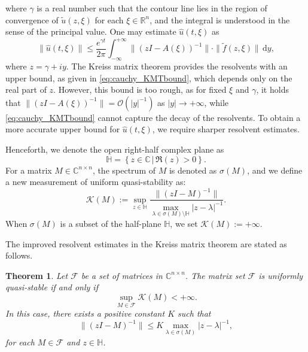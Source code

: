 \documentclass{article}
\theoremstyle{plain}%
\newtheorem{theorem}{Theorem}%
\theoremstyle{definition}%
\theoremstyle{remark}%
\newcommand{\bC}{\mathbb{C}}
\newcommand{\bH}{\mathbb{H}}
\newcommand{\bR}{\mathbb{R}}
\newcommand{\cF}{\mathcal{F}}
\newcommand{\cK}{\mathcal{K}}
\newcommand{\cO}{\mathcal{O}}
\newcommand{\rd}{\mathrm{d}}
\newcommand{\+}[1]{{\bm{#1}}}
\newcommand{\norm}[1]{\|{#1}\|}
\begin{document}
where $\gamma$ is a real number such that the contour line lies in 
the region of convergence of $\tilde{u}(z, \xi)$ for each 
$\xi \in \bR^n$, and the integral is understood in the sense of 
the principal value.
One may estimate $\hat{u}(t, \xi)$ as 
\begin{displaymath}
  \|{\hat{u}(t, \xi)}\| \le \frac{e^{\gamma t}}{2 \pi} 
    \int_{- \infty}^{+ \infty} \|{(z I - A(\xi))^{-1}}\|
    \cdot \|{\tilde{f}(z, \xi)}\| \,\rd y,
\end{displaymath}
where $z = \gamma + i y$. The Kreiss matrix theorem provides the 
resolvents with an upper bound, as given in 
\cref{eq:cauchy_KMTbound}, which depends only on the real part 
of $z$. However, this bound is too rough, as for fixed $\xi$ and 
$\gamma$, it holds that $\|{(z I - A(\xi))^{-1}}\| = \cO(|y|^{-1})$
as $|y| \rightarrow + \infty$,
while \cref{eq:cauchy_KMTbound} cannot capture the decay of the 
resolvents.
To obtain a more accurate upper bound for $\hat{u}(t, \xi)$, we 
require sharper resolvent estimates.

Henceforth, we denote the open right-half complex plane as 
\begin{displaymath}
  \bH = \left\{ z \in \bC \,\big|\, \Re(z) > 0 \right\}.
\end{displaymath}
For a matrix $M \in \bC^{n \times n}$, the spectrum of $M$ is 
denoted as $\sigma(M)$, and we define a new measurement of uniform 
quasi-stability as:
\begin{displaymath}
  \cK(M) := \sup_{z \in \bH} \frac{\norm{(z I - M)^{-1}}}
  {\max_{\lambda \in \sigma(M) \setminus \bH} |z - \lambda|^{-1}}.
\end{displaymath}
When $\sigma(M)$ is a subset of the half-plane $\bH$, we set 
$\cK(M) := + \infty$.

The improved resolvent estimates in the Kreiss matrix theorem are 
stated as follows.

\begin{theorem}\label{thm:IKMT}
  Let $\cF$ be a set of matrices in $\bC^{n \times n}$.
  The matrix set $\cF$ is uniformly quasi-stable if and only if 
  \begin{equation}\label{eq:uniformKM}
    \sup_{M \in \cF} \cK(M) < + \infty.
  \end{equation}
  In this case, there exists a positive constant $K$ such that 
  \begin{equation}\label{eq:main_resolvent}
    \norm{(z I - M)^{-1}} \le K \max_{\lambda \in \sigma(M)} 
    |z - \lambda|^{-1},
  \end{equation}
  for each $M \in \cF$ and $z \in \bH$.
\end{theorem}
\end{document}
